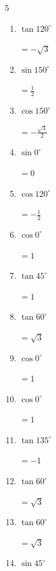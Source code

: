 \begin{multicols}{5}
\begin{enumerate}
  \item $\displaystyle \tan{120^\circ}$

        $\displaystyle =-\sqrt{3}$

  \item $\displaystyle \sin{150^\circ}$

        $\displaystyle =\frac{1}{2}$

\columnbreak %

  \item $\displaystyle \cos{150^\circ}$

        $\displaystyle =-\frac{\sqrt{3}}{2}$

  \item $\displaystyle \sin{0^\circ}$

        $\displaystyle =0$

  \item $\displaystyle \cos{120^\circ}$

        $\displaystyle =-\frac{1}{2}$

  \item $\displaystyle \cos{0^\circ}$

        $\displaystyle =1$

  \item $\displaystyle \tan{45^\circ}$

        $\displaystyle =1$

  \item $\displaystyle \tan{60^\circ}$

        $\displaystyle =\sqrt{3}$

  \item $\displaystyle \cos{0^\circ}$

        $\displaystyle =1$

  \item $\displaystyle \cos{0^\circ}$

        $\displaystyle =1$

  \item $\displaystyle \tan{135^\circ}$

        $\displaystyle =-1$

  \item $\displaystyle \tan{60^\circ}$

        $\displaystyle =\sqrt{3}$

  \item $\displaystyle \tan{60^\circ}$

        $\displaystyle =\sqrt{3}$

  \item $\displaystyle \sin{45^\circ}$


\end{enumerate}
\end{multicols}
